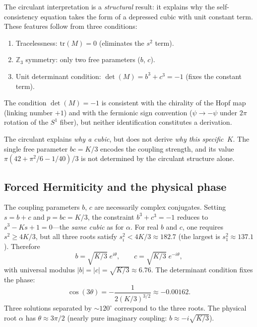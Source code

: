 \documentclass[aps,prl,twocolumn,superscriptaddress]{revtex4-2}
\begin{document}
The circulant interpretation is a \textit{structural} result: it
explains why the self-consistency equation takes the form of a
depressed cubic with unit constant term. These features follow from
three conditions:
\begin{enumerate}
\item Tracelessness: $\mathrm{tr}(M) = 0$ (eliminates the $s^2$ term).
\item $\mathbb{Z}_3$ symmetry: only two free parameters ($b$, $c$).
\item Unit determinant condition: $\det(M) = b^3 + c^3 = -1$ (fixes
  the constant term).
\end{enumerate}

The condition $\det(M) = -1$ is consistent with the chirality of the
Hopf map (linking number $+1$) and with the fermionic sign convention
($\psi \to -\psi$ under $2\pi$ rotation of the $S^1$ fiber), but
neither identification constitutes a derivation.

The circulant explains \textit{why a cubic}, but does not derive
\textit{why this specific~$K$}. The single free parameter $bc = K/3$
encodes the coupling strength, and its value
$\pi(42 + \pi^2/6 - 1/40)/3$ is not determined by the circulant
structure alone.

\subsection{Forced Hermiticity and the physical phase}

The coupling parameters $b$, $c$ are necessarily complex conjugates.
Setting $s = b + c$ and $p = bc = K/3$, the constraint $b^3 + c^3 = -1$
reduces to $s^3 - Ks + 1 = 0$---the \textit{same cubic} as for
$\alpha$. For real $b$ and $c$, one requires $s^2 \geq 4K/3$, but all
three roots satisfy $s_i^2 < 4K/3 \approx 182.7$ (the largest is
$s_1^2 \approx 137.1$). Therefore~\cite{phase3_audit}
\begin{equation}\label{eq:polar}
  b = \sqrt{K/3}\; e^{i\theta}, \qquad
  c = \sqrt{K/3}\; e^{-i\theta},
\end{equation}
with universal modulus $|b| = |c| = \sqrt{K/3} \approx 6.76$. The
determinant condition fixes the phase:
\begin{equation}\label{eq:phase}
  \cos(3\theta) = -\frac{1}{2(K/3)^{3/2}} \approx -0.00162.
\end{equation}
Three solutions separated by ${\sim}120^\circ$ correspond to the
three roots. The physical root $\alpha$ has $\theta \approx 3\pi/2$
(nearly pure imaginary coupling: $b \approx -i\sqrt{K/3}$).
\end{document}
